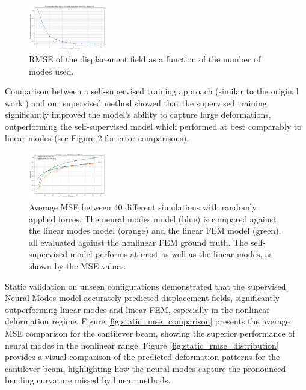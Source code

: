 \documentclass[11pt,a4paper,twocolumn]{article}
\begin{document}
\begin{figure}[H]
    \centering
    \includegraphics[width=0.3\textwidth]{Images/rmse_vs_modes.png}
    \caption{RMSE of the displacement field as a function of the number of modes used.}
    \label{fig:optimal_number_modes}
\end{figure}

Comparison between a self-supervised training approach (similar to the original work \cite{Wang_Du_Coros_Thomaszewski_2024}) and our supervised method showed that the supervised training significantly improved the model's ability to capture large deformations, outperforming the self-supervised model which performed at best comparably to linear modes (see Figure \ref{fig:self_supervised_validation_mse_comparison} for error comparisons).

\begin{figure}[H]
    \centering
    \includegraphics[width=0.3\textwidth]{Images/self_supervised_mse.png}
    \caption{Average MSE between 40 different simulations with randomly applied forces. The neural modes model (blue) is compared against the linear modes model (orange) and the linear FEM model (green), all evaluated against the nonlinear FEM ground truth. The self-supervised model performs at most as well as the linear modes, as shown by the MSE values.}
    \label{fig:self_supervised_validation_mse_comparison}
\end{figure}

Static validation on unseen configurations demonstrated that the supervised Neural Modes model accurately predicted displacement fields, significantly outperforming linear modes and linear FEM, especially in the nonlinear deformation regime. Figure \ref{fig:static_mse_comparison} presents the average MSE comparison for the cantilever beam, showing the superior performance of neural modes in the nonlinear range. Figure \ref{fig:static_rmse_distribution} provides a visual comparison of the predicted deformation patterns for the cantilever beam, highlighting how the neural modes capture the pronounced bending curvature missed by linear methods.
\end{document}
